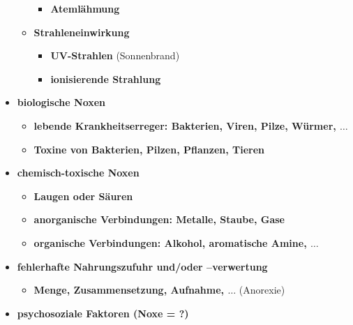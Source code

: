 \begin{itemize}
\begin{itemize}
\begin{itemize}
						\item \textbf{Atemlähmung}
					\end{itemize}
				\item \textbf{Strahleneinwirkung}
					\begin{itemize}
						\item \textbf{UV-Strahlen} (Sonnenbrand)
						\item \textbf{ionisierende Strahlung}
					\end{itemize}
			\end{itemize}
		\item \textbf{biologische Noxen}
			\begin{itemize}
				\item \textbf{lebende Krankheitserreger: Bakterien, Viren, Pilze, Würmer, $\dots$}
				\item \textbf{Toxine von Bakterien, Pilzen, Pflanzen, Tieren}
			\end{itemize}
		\item \textbf{chemisch-toxische Noxen}
			\begin{itemize}
				\item \textbf{Laugen oder Säuren}
				\item \textbf{anorganische Verbindungen: Metalle, Staube, Gase}
				\item \textbf{organische Verbindungen: Alkohol, aromatische Amine, $\dots$}
			\end{itemize}
		\item \textbf{fehlerhafte Nahrungszufuhr und/oder –verwertung}
			\begin{itemize}
				\item \textbf{Menge, Zusammensetzung, Aufnahme, $\dots$} (Anorexie)
			\end{itemize}
		\item \textbf{psychosoziale Faktoren (Noxe = ?)}
	\end{itemize}

